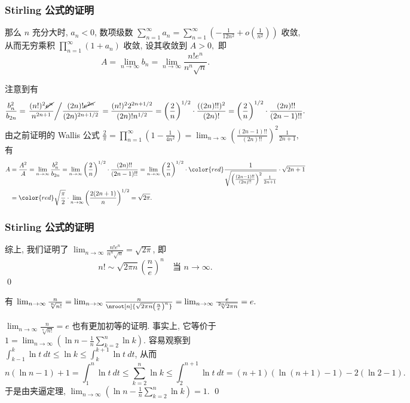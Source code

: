 
\begin{frame}
\frametitle{Stirling 公式的证明}

那么 $n$ 充分大时, $a_n < 0$, 数项级数 $\sum_{n=1}^\infty a_n = \sum_{n=1}^\infty \left( -\frac{1}{12n^2} + o\left(\frac{1}{n^2}\right) \right)$ 收敛, 从而无穷乘积 $\prod_{n=1}^\infty (1 + a_n)$ 收敛, 设其收敛到 $A > 0,$ 即
\[
A = \lim_{n \to \infty} b_n = \lim_{n \to \infty} \frac{n! e^n}{n^n \sqrt{n}}.
\]

\pause

注意到有
\[
\frac{b_n^2}{b_{2n}} = \left. \frac{(n!)^2 \cancel{e^n}}{n^{2n+1}} \middle/ \frac{(2n)! \cancel{e^{2n}}}{(2n)^{2n+1/2}} \right. = \frac{(n!)^2 2^{2n+1/2}}{(2n)! n^{1/2}} = \left( \frac{2}{n} \right)^{1/2} \cdot \frac{((2n)!!)^2}{(2n)!} = \left( \frac{2}{n} \right)^{1/2} \cdot \frac{(2n)!!}{(2n-1)!!}.
\]
\pause
由之前证明的 Wallis 公式 $\frac{2}{\pi} = \prod_{n=1}^\infty \left( 1 - \frac{1}{4n^2} \right) = \lim_{n \to \infty} \left( \frac{(2n-1)!!}{(2n)!!} \right)^2 \frac{1}{2n+1},$ 有
\begin{align*}
A & = \frac{A^2}{A} = \lim_{n \to \infty} \frac{b_n^2}{b_{2n}} = \lim_{n \to \infty} \left( \frac{2}{n} \right)^{1/2} \cdot \frac{(2n)!!}{(2n-1)!!} = \lim_{n \to \infty} \left( \frac{2}{n} \right)^{1/2} \cdot {\color{red} \frac{1}{\sqrt{\left( \frac{(2n-1)!!}{(2n)!!} \right)^2 \frac{1}{2n+1}}}} \cdot \sqrt{2n+1} \\
& = {\color{red} \sqrt{\frac{\pi}{2}}} \cdot \lim_{n \to \infty} \left( \frac{2(2n+1)}{n} \right)^{1/2} = \sqrt{2\pi}.
\end{align*}

\end{frame}


\begin{frame}
\frametitle{Stirling 公式的证明}

综上, 我们证明了 $\lim_{n \to \infty} \frac{n! e^n}{n^n \sqrt{n}} = \sqrt{2\pi}$, 即
\[
n! \sim \sqrt{2\pi n} \left( \frac{n}{e} \right)^n \quad \text{当 } n \to \infty.
\]
\qed

\pause

\begin{cor}
有 $\lim_{n \to \infty} \frac{n}{\sqrt[n]{n!}} = \lim_{n \to \infty} \frac{n}{\nroot[n]{\sqrt{2\pi n} \left( \frac{n}{e} \right)^n}} = \lim_{n \to \infty} \frac{e}{\sqrt[2n]{2\pi n}} = e.$
\end{cor}

\pause

$\lim_{n \to \infty} \frac{n}{\sqrt[n]{n!}} = e$ 也有更加初等的证明. 事实上, 它等价于 $1 = \lim_{n \to \infty} \left( \ln n - \frac{1}{n} \sum_{k=2}^n \ln k \right)$.
\pause
容易观察到 $\int_{k-1}^k \ln t ~ dt \leqslant \ln k \leqslant \int_k^{k+1} \ln t ~ dt$, 从而
\[
n (\ln n - 1) + 1 = \int_1^n \ln t ~ dt \leqslant \sum_{k=2}^n \ln k \leqslant \int_2^{n+1} \ln t ~ dt = (n+1) (\ln (n+1) - 1) - 2 (\ln 2 - 1).
\]
于是由夹逼定理, $\lim_{n \to \infty} \left( \ln n - \frac{1}{n} \sum_{k=2}^n \ln k \right) = 1$.
\qed

\end{frame}

